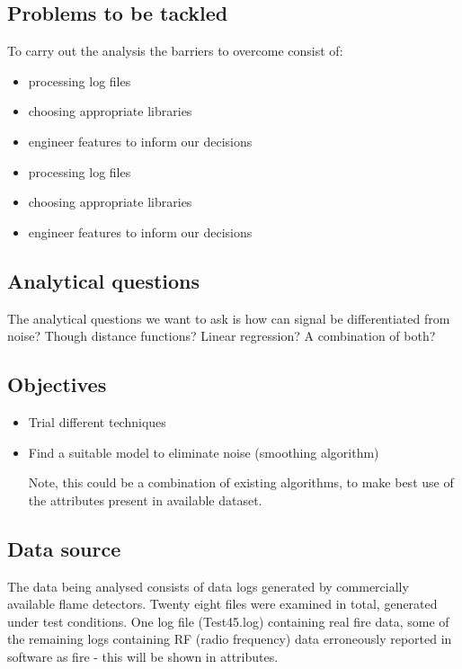 \subsection{Problems to be tackled}

To carry out the analysis the barriers to overcome consist of:

\begin{itemize}
\item processing log files
\item choosing appropriate libraries
\item engineer features to inform our decisions
\item processing log files
\item choosing appropriate libraries
\item engineer features to inform our decisions

\end{itemize}

\subsection{Analytical questions}

The analytical questions we want to ask is how can signal be differentiated from noise? Though distance functions? Linear regression? A combination of both?

\subsection{Objectives}

\begin{itemize}
\item Trial different techniques
\item Find a suitable model to eliminate noise (smoothing algorithm)

Note, this could be a combination of existing algorithms, to make best use of the attributes present in available dataset.
\end{itemize}

\subsection{Data source} 

The data being analysed consists of data logs generated by commercially available flame detectors. Twenty eight files were examined in total, generated under test conditions. One log file (Test45.log) containing real fire data, some of the remaining logs containing RF (radio frequency) data erroneously reported in software as fire - this will be shown in attributes.

